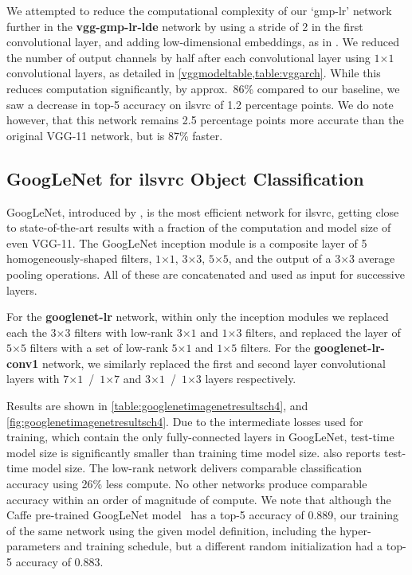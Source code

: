 \documentclass[thesis]{subfiles}
\begin{document}
    We attempted to reduce the computational complexity of our `gmp-lr' network further in the \textbf{vgg-gmp-lr-lde} network by using a stride of 2 in the first convolutional layer, and adding low-dimensional embeddings, as in \citet{Lin2013NiN,Szegedy2014going}. We reduced the number of output channels by half after each convolutional layer using $1$$\times$$1$ convolutional layers, as detailed in \cref{vggmodeltable,table:vggarch}. While this reduces computation significantly, by approx.~86\% compared to our baseline, we saw a decrease in top-5 accuracy on \gls{ilsvrc} of 1.2 percentage points. We do note however, that this network remains 2.5 percentage points more accurate than the original VGG-11 network, but is 87\% faster.
    
    \subsection{GoogLeNet for \gls{ilsvrc} Object Classification}
    GoogLeNet, introduced by \citet{Szegedy2014going}, is the most efficient network for \gls{ilsvrc}, getting close to state-of-the-art results with a fraction of the computation and model size of even VGG-11. The GoogLeNet \gls{inception} module is a composite layer of 5 homogeneously-shaped filters, $1$$\times$$1$, $3$$\times$$3$, $5$$\times$$5$, and the output of a 3$\times$3 average pooling operations. All of these are concatenated and used as input for successive layers. 
    
    For the \textbf{googlenet-lr} network, within only the \gls{inception} modules we replaced each the $3$$\times$$3$ filters with low-rank $3$$\times$$1$ and $1$$\times$$3$ filters, and replaced the layer of $5$$\times$$5$ filters with a set of low-rank $5$$\times$$1$ and $1$$\times$$5$ filters. For the \textbf{googlenet-lr-conv1} network, we similarly replaced the first and second layer convolutional layers with $7$$\times$$1$~/~$1$$\times$$7$ and $3$$\times$$1$~/~$1$$\times$$3$ layers respectively.
    
    Results are shown in \cref{table:googlenetimagenetresultsch4}, and \cref{fig:googlenetimagenetresultsch4}. Due to the intermediate losses used for training, which contain the only fully-connected layers in GoogLeNet, test-time model size is significantly smaller than training time model size.  also reports test-time model size. The low-rank network delivers comparable classification accuracy using 26\% less compute.  No other networks produce comparable accuracy within an order of magnitude of compute. We note that although the Caffe pre-trained GoogLeNet model~\citep{Jia2014} has a top-5 accuracy of 0.889, our training of the same network using the given model definition, including the hyper-parameters and training schedule, but a different random initialization had a top-5 accuracy of 0.883.
    
\end{document}
